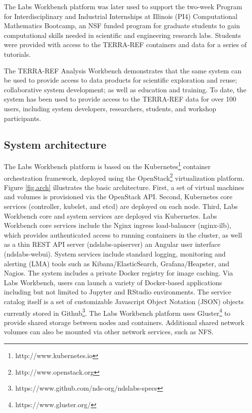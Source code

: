 \documentclass{sig-alternate}
\begin{document}
The Labs Workbench platform was later used to support the two-week Program for Interdisciplinary and Industrial Internships at Illinois (PI4) Computational Mathematics Bootcamp, an NSF funded program for graduate students to gain computational skills needed in scientific and engineering research labs. Students were provided with access to the TERRA-REF containers and data for a series of tutorials.

The TERRA-REF Analysis Workbench demonstrates that the same system can be used to provide access to data products for scientific exploration and reuse; collaborative system development; as well as education and training. To date, the system has been used to provide access to the TERRA-REF data for over 100 users, including system developers, researchers, students, and workshop participants.


\subsection{System architecture}

The Labs Workbench platform is based on the Kubernetes\footnote{http://www.kubernetes.io} container orchestration framework, deployed using the OpenStack\footnote{http://www.openstack.org} virtualization platform. Figure \ref{fig.arch} illustrates the basic architecture. First, a set of virtual machines and volumes is provisioned via the OpenStack API. Second, Kubernetes core services (controller, kubelet, and etcd) are deployed on each node. Third, Labs Workbench core and system services are deployed via Kubernetes. Labs Workbench core services include the Nginx ingress load-balancer (nginx-ilb), which provides authenticated access to running containers in the cluster, as well as a thin REST API server (ndslabs-apiserver) an Angular user interface (ndslabs-webui). System services include standard logging, monitoring and alerting (LMA) tools such as Kibana/ElasticSearch, Grafana/Heapster, and Nagios.  The system includes a private Docker registry for image caching.  Via Labs Workbench, users can launch a variety of Docker-based applications including but not limited to Jupyter and RStudio environments. The service catalog itself is a set of customizable Javascript Object Notation (JSON) objects currently stored in Github\footnote{https://www.github.com/nds-org/ndslabs-specs}. The Labs Workbench platform uses Gluster\footnote{https://www.gluster.org/} to provide shared storage between nodes and containers. Additional shared network volumes can also be mounted via other network services, such as NFS.
\end{document}
